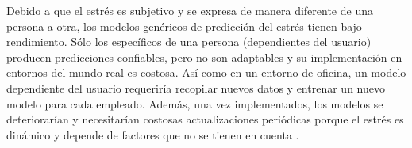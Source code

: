 






Debido a que el estrés es subjetivo y se expresa de manera diferente de una 
persona a otra, los modelos genéricos de predicción del estrés tienen bajo rendimiento. Sólo los específicos 
de una persona (dependientes del usuario) producen predicciones confiables, pero no son adaptables y su 
implementación en entornos del mundo real es costosa.
Así como  en un entorno de oficina, un modelo  dependiente del usuario requeriría recopilar nuevos datos y entrenar un nuevo modelo para cada empleado. Además, una vez implementados, los modelos se deteriorarían y necesitarían 
costosas actualizaciones periódicas porque el estrés es dinámico y depende de factores que no se tienen en cuenta .




















